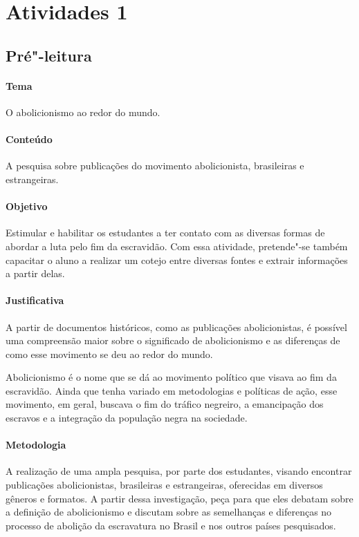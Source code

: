 \documentclass[12pt]{extarticle}
\begin{document}
\tableofcontents


\section{Atividades 1}


\subsection{Pré"-leitura}


\paragraph{Tema} O abolicionismo ao redor do mundo.

\paragraph{Conteúdo} A pesquisa sobre publicações do movimento abolicionista, brasileiras e estrangeiras.

\paragraph{Objetivo} Estimular e habilitar os estudantes a ter contato
com as diversas formas de abordar a luta pelo fim da escravidão. 
Com essa atividade, pretende"-se também capacitar o aluno a
realizar um cotejo entre diversas fontes e extrair informações a partir delas.

\paragraph{Justificativa} A partir de documentos históricos, como as publicações abolicionistas,
é possível uma compreensão maior sobre o significado de abolicionismo e as diferenças de 
como esse movimento se deu ao redor do mundo.

Abolicionismo é o nome que se dá ao movimento político que
visava ao fim da escravidão. Ainda que tenha variado em metodologias e
políticas de ação, esse movimento, em geral, buscava o fim do tráfico
negreiro, a emancipação dos escravos e a integração da população negra
na sociedade.

\paragraph{Metodologia} A realização de uma ampla pesquisa, por parte dos estudantes,
visando encontrar publicações abolicionistas, brasileiras e estrangeiras, 
oferecidas em diversos gêneros e formatos. A partir dessa investigação, peça para que 
eles debatam sobre a definição de abolicionismo e discutam sobre as semelhanças e 
diferenças no processo de abolição da escravatura no Brasil e nos outros países pesquisados.
\end{document}
